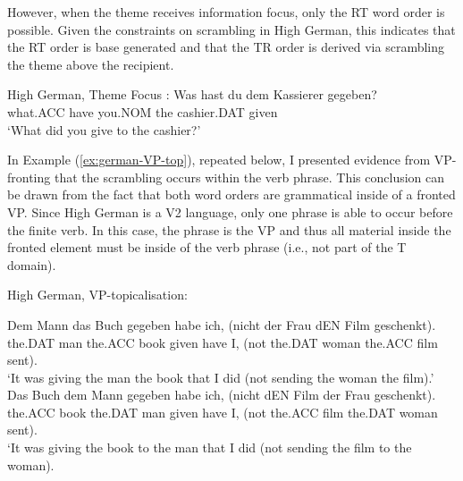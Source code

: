 However, when the theme receives information focus, only the RT word order is possible. Given the constraints on scrambling in High German, this indicates that the RT order is base generated and that the TR order is derived via scrambling the theme above the recipient.

\begin{exe}
	\ex High German, Theme Focus \citep{Choi.1996}:\label{ex:hg-theme-focus}
	\gll Was hast du dem Kassierer gegeben?\\
what.ACC have you.NOM the cashier.DAT given\\
\trans `What did you give to the cashier?'

\begin{xlist}

\end{xlist}
\end{exe}

In Example (\ref{ex:german-VP-top}), repeated below, I presented evidence from VP-fronting that the scrambling occurs within the verb phrase. This conclusion can be drawn from the fact that both word orders are grammatical inside of a fronted VP. Since High German is a V2 language, only one phrase is able to occur before the finite verb. In this case, the phrase is the VP and thus all material inside the fronted element must be inside of the verb phrase (i.e., not part of the T domain).

	\begin{exe}
		 High German, VP-topicalisation:
		\begin{xlist}
			\ex \gll  Dem Mann das Buch gegeben habe ich, (nicht der Frau dEN Film geschenkt).\\
			the.DAT man the.ACC book given have I, (not the.DAT woman the.ACC film sent).\\
			\trans `It was giving the man the book that I did (not sending the woman the film).'
			\ex \gll Das Buch dem Mann gegeben habe ich, (nicht dEN Film der Frau geschenkt).\\
			the.ACC book the.DAT man given have I, (not the.ACC film the.DAT woman sent).\\
			\trans `It was giving the book to the man that I did (not sending the film to the woman).\\
		\end{xlist}
	\end{exe}

